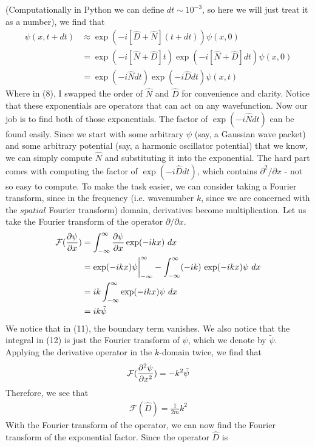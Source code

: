 \documentclass{article}
\begin{document}
(Computationally in Python we can define $dt\sim 10^{-3}$, so here we will just treat it as a number), we find that 
\begin{align}
    \psi(x,t+dt)&\approx\exp(-i[\hat{D}+\hat{N}](t+dt))\psi(x,0)\\
    &=\exp(-i[\hat{N}+\hat{D}]t)\exp(-i[\hat{N}+\hat{D}]dt)\psi(x,0)\\ 
    &=\exp(-i\hat{N}dt)\exp(-i\hat{D}dt)\psi(x,t)
\end{align}
Where in (8), I swapped the order of $\hat{N}$ and $\hat{D}$ for convenience and clarity.
Notice that these exponentials are operators that can act on any wavefunction. 
Now our job is to find both of those exponentials. The factor of $\exp(-i\hat{N}dt)$
can be found easily. Since we start with some arbitrary $\psi$  (say, a Gaussian wave packet) 
and some arbitrary potential (say, a harmonic oscillator potential) that we know, 
we can simply compute $\hat{N}$ and substituting it into the exponential. The hard part comes with 
computing the factor of $\exp(-i\hat{D}dt)$, which contains $\partial^2/\partial x$ - not 
so easy to compute. To make the task easier, we can consider taking a 
Fourier transform, since in the 
frequency (i.e. wavenumber $k$, since we are concerned with the $spatial$ 
Fourier transform)
domain, derivatives become multiplication. Let us take the Fourier transform of 
the operator
$\partial/\partial x$.
\begin{align}
    \mathcal{F}(\pdv{{\psi}}{x})&=\int_{-\infty}^{\infty}\pdv{\psi}{x}\exp(-ikx)\ dx\\ 
    &=\exp(-ikx)\psi \bigg|_{-\infty}^{\infty}-\int_{-\infty}^{\infty} (-ik)\ {\exp(-ikx)}\psi\ dx\\ 
    &=ik\int_{-\infty}^{\infty}\exp(-ikx)\psi\ dx\\
    &=ik\tilde{\psi}
\end{align}  
We notice that in (11), the boundary term vanishes. We also notice that the integral in (12) is 
just the Fourier transform of $\psi$, which we denote by $\tilde{\psi}$. 
Applying the derivative operator in the $k$-domain twice, we find that  
\begin{align}
    \mathcal{F}(\pdv[2]{{\psi}}{x})=-k^2\tilde{\psi}
\end{align}
Therefore, we see that 
\begin{align}
    \mathcal{F}(\hat{D})=\frac{1}{2m}k^2
\end{align}
With the Fourier transform of the operator, 
we can now find the Fourier transform of the exponential factor. Since the operator $\hat{D}$ is 
\end{document}
